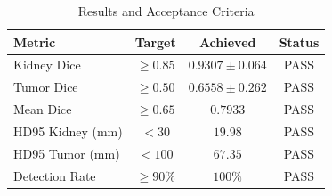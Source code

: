 \begin{table}[!t]
\caption{Results and Acceptance Criteria}
\label{tab:results_acceptance}
\centering
\begin{tabular}{@{}lccc@{}}
\toprule
\textbf{Metric} & \textbf{Target} & \textbf{Achieved} & \textbf{Status} \\
\midrule
Kidney Dice & $\geq 0.85$ & $0.9307 \pm 0.064$ & PASS \\
Tumor Dice & $\geq 0.50$ & $0.6558 \pm 0.262$ & PASS \\
Mean Dice & $\geq 0.65$ & $0.7933$ & PASS \\
HD95 Kidney (mm) & $< 30$ & $19.98$ & PASS \\
HD95 Tumor (mm) & $< 100$ & $67.35$ & PASS \\
Detection Rate & $\geq 90\%$ & $100\%$ & PASS \\
\bottomrule
\end{tabular}
\end{table}
